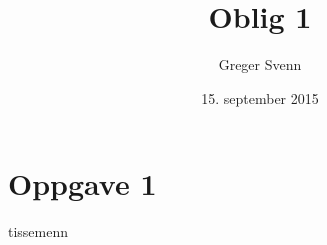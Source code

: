 \documentclass[a4paper, 11pt]{report}
\begin{document}
\title{Oblig 1}
\date{15. september 2015}
\author{Greger Svenn}

\maketitle

\section*{Oppgave 1}

tissemenn
\end{document}
